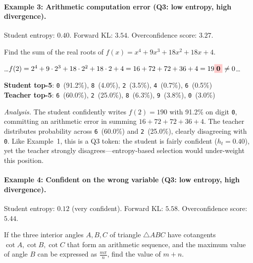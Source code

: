 \documentclass{article}
\begin{document}
\paragraph{Example 3: Arithmetic computation error (\textbf{Q3}: low entropy, high divergence).}
Student entropy: $0.40$. Forward KL: $3.54$. Overconfidence score: $3.27$.

\begin{tcolorbox}[colback=gray!5, colframe=black, boxrule=0.5pt, title={Problem}]
Find the sum of the real roots of $f(x) = x^4 + 9x^3 + 18x^2 + 18x + 4$.
\end{tcolorbox}

\begin{tcolorbox}[colback=blue!3, colframe=black, boxrule=0.5pt, title={Student response (excerpt)}]
\small
\ldots $f(2) = 2^4 + 9 \cdot 2^3 + 18 \cdot 2^2 + 18 \cdot 2 + 4 = 16 + 72 + 72 + 36 + 4 = 19\colorbox{red!20}{\textbf{0}} \neq 0$\ldots
\end{tcolorbox}

\begin{tcolorbox}[colback=yellow!5, colframe=black, boxrule=0.5pt, title={Token distributions}]
\small
\textbf{Student top-5}: \texttt{0}~(91.2\%), \texttt{8}~(4.0\%), \texttt{2}~(3.5\%), \texttt{4}~(0.7\%), \texttt{6}~(0.5\%) \\
\textbf{Teacher top-5}: \texttt{6}~(60.0\%), \texttt{2}~(25.0\%), \texttt{8}~(6.3\%), \texttt{9}~(3.8\%), \texttt{0}~(3.0\%)
\end{tcolorbox}

\noindent\textit{Analysis.}
The student confidently writes $f(2) = 190$ with 91.2\% on digit \texttt{0}, committing an arithmetic error in summing $16 + 72 + 72 + 36 + 4$.
The teacher distributes probability across \texttt{6}~(60.0\%) and \texttt{2}~(25.0\%), clearly disagreeing with \texttt{0}.
Like Example~1, this is a Q3 token: the student is fairly confident ($h_t = 0.40$), yet the teacher strongly disagrees---entropy-based selection would under-weight this position.

\paragraph{Example 4: Confident on the wrong variable (\textbf{Q3}: low entropy, high divergence).}
Student entropy: $0.12$ (very confident). Forward KL: $5.58$. Overconfidence score: $5.44$.

\begin{tcolorbox}[colback=gray!5, colframe=black, boxrule=0.5pt, title={Problem}]
If the three interior angles $A, B, C$ of triangle $\triangle ABC$ have cotangents $\cot A, \cot B, \cot C$ that form an arithmetic sequence, and the maximum value of angle $B$ can be expressed as $\frac{m\pi}{n}$, find the value of $m + n$.
\end{tcolorbox}
\end{document}
